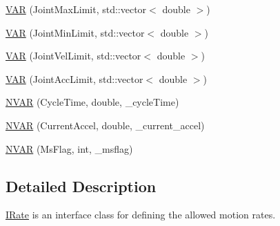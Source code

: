 \begin{DoxyCompactItemize}
\item 
\hyperlink{classRCS_1_1IRate_ae637d8d93769168434d67bc6971df343}{V\-A\-R} (Joint\-Max\-Limit, std\-::vector$<$ double $>$)
\item 
\hyperlink{classRCS_1_1IRate_a702e8b9a2d3d6f1c60240d6179e8ed17}{V\-A\-R} (Joint\-Min\-Limit, std\-::vector$<$ double $>$)
\item 
\hyperlink{classRCS_1_1IRate_ab62d7d8cab1b4cc52f8b5fe9f552f661}{V\-A\-R} (Joint\-Vel\-Limit, std\-::vector$<$ double $>$)
\item 
\hyperlink{classRCS_1_1IRate_af5dbd66ac13def8ab6c5211715d6f480}{V\-A\-R} (Joint\-Acc\-Limit, std\-::vector$<$ double $>$)
\item 
\hyperlink{classRCS_1_1IRate_ac76bd2dad2dbbb7d5eb3c9fc62268e7d}{N\-V\-A\-R} (Cycle\-Time, double, \-\_\-cycle\-Time)
\item 
\hyperlink{classRCS_1_1IRate_ab3a49ecf0a0d182984250c176740b226}{N\-V\-A\-R} (Current\-Accel, double, \-\_\-current\-\_\-accel)
\item 
\hyperlink{classRCS_1_1IRate_a8ab4cadeb7f5188e3223dcc321be3e61}{N\-V\-A\-R} (Ms\-Flag, int, \-\_\-msflag)
\end{DoxyCompactItemize}


\subsection{Detailed Description}
\hyperlink{classRCS_1_1IRate}{I\-Rate} is an interface class for defining the allowed motion rates. 

